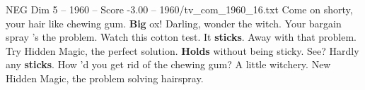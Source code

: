 \begin{textsample}{NEG Dim 5 – 1960 – Score -3.00 – 1960/tv\_com\_1960\_16.txt}  \label{ex:f5_neg_005}
Come on shorty, your hair like chewing gum. \textbf{Big} ox!
Darling, wonder the witch.
Your bargain spray 's the problem.
Watch this cotton test.
It \textbf{sticks}.
Away with that problem.
Try Hidden Magic, the perfect solution. \textbf{Holds} without being sticky.
See?
Hardly any \textbf{sticks}.
How 'd you get rid of the chewing gum?
A little witchery.
New Hidden Magic, the problem solving hairspray.

\end{textsample}

